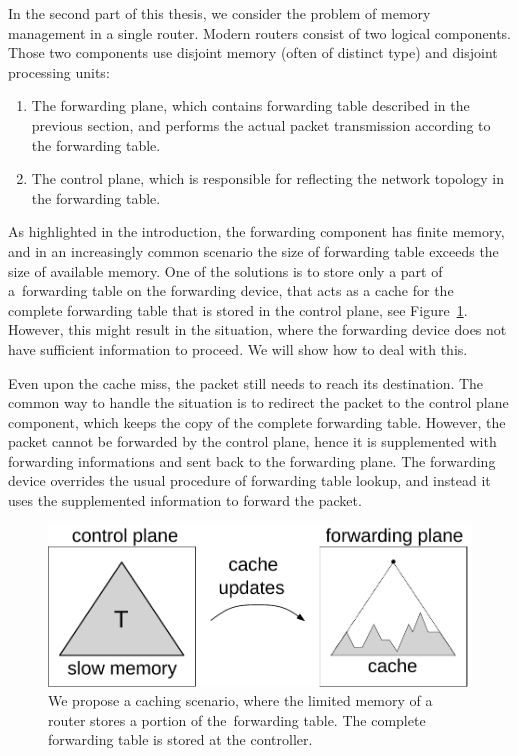 In the second part of this thesis, we consider the problem of memory management in a single router.
Modern routers consist of two logical components. Those two components use disjoint memory (often of distinct type) and disjoint processing units:
\begin{enumerate}
  \item The forwarding plane, which  contains forwarding table described in the previous section, and performs the actual packet transmission according to the forwarding table.
  \item The control plane, which is responsible for reflecting the network topology in the forwarding table.
\end{enumerate}

As highlighted in the introduction, the forwarding component has finite memory, and in an increasingly common scenario the size of forwarding table exceeds the size of available memory.
One of the solutions is to store only a part of a~forwarding table on the forwarding device, that acts as a cache for the complete forwarding table that is stored in the control plane, see Figure~\ref{fig:router}.
However, this might result in the situation, where the forwarding device does not have sufficient information to proceed.
We will show how to deal with this.

Even upon the cache miss, the packet still needs to reach its destination.
The common way to handle the situation is to redirect the packet to the control plane component, which keeps the copy of the complete forwarding table.
However, the packet cannot be forwarded by the control plane, hence it is supplemented with forwarding informations and sent back to the forwarding plane.
The forwarding device overrides the usual procedure of forwarding table lookup, and instead it uses the supplemented information to forward the packet.


\begin{figure}[t]
\centering
\includegraphics[width=0.5\columnwidth]{figs/router5.pdf}
\caption{We propose a caching scenario, where the limited memory of a router stores a portion of the~forwarding table. The complete forwarding table is stored at the controller.}\label{fig:router}
\end{figure}




